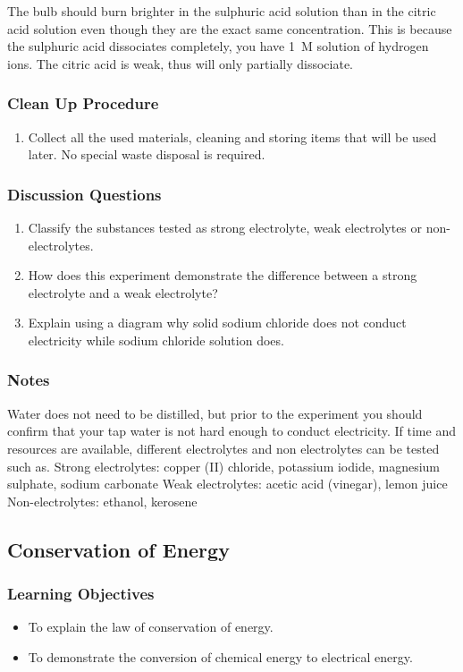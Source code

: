 The bulb should burn brighter in the sulphuric acid solution than in the citric acid solution even though they are the exact same concentration. This is because the sulphuric acid dissociates completely, you have 1~M solution of hydrogen ions. The citric acid is weak, thus will only partially dissociate.

\subsubsection*{Clean Up Procedure}
\begin{enumerate}
\item{Collect all the used materials, cleaning and storing items that will be used later. No special waste disposal is required.}
\end{enumerate}

\subsubsection*{Discussion Questions}
\begin{enumerate}
\item{Classify the substances tested as strong electrolyte, weak electrolytes or non-electrolytes.}
\item{How does this experiment demonstrate the difference between a strong electrolyte and a weak electrolyte?}
\item{Explain using a diagram why solid sodium chloride does not conduct electricity while sodium chloride solution does.}
\end{enumerate}

\subsubsection*{Notes}
Water does not need to be distilled, but prior to the experiment you should confirm that your tap water is not hard enough to conduct electricity.
If time and resources are available, different electrolytes and non electrolytes can be tested such as.
Strong electrolytes: copper (II) chloride, potassium iodide, magnesium sulphate, sodium carbonate
Weak electrolytes: acetic acid (vinegar), lemon juice
Non-electrolytes: ethanol, kerosene

\subsection{Conservation of Energy}

\subsubsection*{Learning Objectives}
\begin{itemize}
\item{To explain the law of conservation of energy.}
\item{To demonstrate the conversion of chemical energy to electrical energy.}
\end{itemize}

